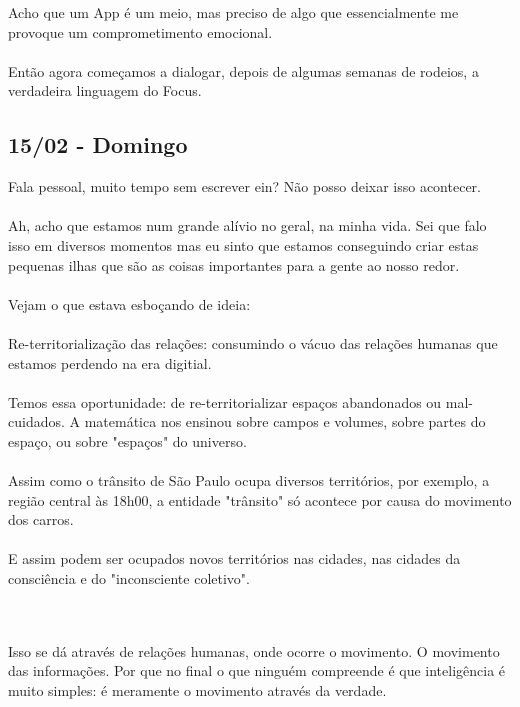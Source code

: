 \documentclass[11pt]{article}
\begin{document}
Acho que um App é um meio, mas preciso de algo que essencialmente me provoque um comprometimento emocional.\\\\

Então agora começamos a dialogar, depois de algumas semanas de rodeios, a verdadeira linguagem do Focus.

\subsection{15/02 - Domingo}



Fala pessoal, muito tempo sem escrever ein? Não posso deixar isso acontecer.\\\\

Ah, acho que estamos num grande alívio no geral, na minha vida. Sei que falo isso em diversos momentos mas eu sinto que estamos conseguindo criar estas pequenas ilhas que são as coisas importantes para a gente ao nosso redor.\\\\

Vejam o que estava esboçando de ideia:\\\\

Re-territorialização das relações: consumindo o vácuo das relações humanas que estamos perdendo na era digitial.\\\\

Temos essa oportunidade: de re-territorializar espaços abandonados ou mal-cuidados. A matemática nos ensinou sobre campos e volumes, sobre partes do espaço, ou sobre "espaços" do universo.\\\\

Assim como o trânsito de São Paulo ocupa diversos territórios, por exemplo, a região central às 18h00, a entidade "trânsito" só acontece por causa do movimento dos carros. \\\\

E assim podem ser ocupados novos territórios nas cidades, nas cidades da consciência e do "inconsciente coletivo".\\\\\

Isso se dá através de relações humanas, onde ocorre o movimento. O movimento das informações. Por que no final o que ninguém compreende é que inteligência é muito simples: é meramente o movimento através da verdade.\\\\
\end{document}
